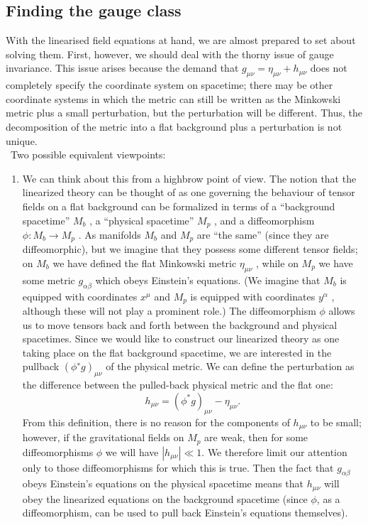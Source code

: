 \subsection{Finding the gauge class}
With the linearised field equations at hand, we are almost prepared to set about solving
them. First, however, we should deal with the thorny issue of gauge invariance. This issue
arises because the demand that $g_{μν} = η_{μν} + h_{μν}$ does not completely specify the coordinate
system on spacetime; there may be other coordinate systems in which the metric can still
be written as the Minkowski metric plus a small perturbation, but the perturbation will be
different. Thus, the decomposition of the metric into a flat background plus a perturbation
is not unique.\\\
Two possible equivalent viewpoints:
\begin{enumerate}
	\item We can think about this from a highbrow point of view. The notion that the linearized
theory can be thought of as one governing the behaviour of tensor fields on a flat background
can be formalized in terms of a “background spacetime” $M_b$ , a “physical spacetime” $M_p$ ,
and a diffeomorphism $\phi : M_b → M_p$ . As manifolds $M_b$ and $M_p$ are “the same” (since
they are diffeomorphic), but we imagine that they possess some different tensor fields; on
$M_b$ we have defined the flat Minkowski metric $η_{μν}$ , while on $M_p$ we have some metric $g_{αβ}$
which obeys Einstein’s equations. (We imagine that $M_b$ is equipped with coordinates $x^μ$ and
$M_p$ is equipped with coordinates $y^α$ , although these will not play a prominent role.) The
diffeomorphism $\phi$ allows us to move tensors back and forth between the background and
physical spacetimes. Since we would like to construct our linearized theory as one taking
place on the flat background spacetime, we are interested in the pullback $(\phi^∗ g)_{μν}$ of the
physical metric. We can define the perturbation as the difference between the pulled-back
physical metric and the flat one:
\begin{equation}
	h_{\mu \nu} = (\phi^* g)_{\mu \nu} -\eta_{\mu \nu}.
\end{equation}
From this definition, there is no reason for the components of $h_{μν}$ to be small; however, if the
gravitational fields on $M_p$ are weak, then for some diffeomorphisms $\phi$ we will have $|h_{μν} | \ll 1$.
We therefore limit our attention only to those diffeomorphisms for which this is true. Then
the fact that $g_{αβ}$ obeys Einstein’s equations on the physical spacetime means that $h_{μν}$ will
obey the linearized equations on the background spacetime (since $\phi$, as a diffeomorphism,
can be used to pull back Einstein’s equations themselves).


\end{enumerate}
